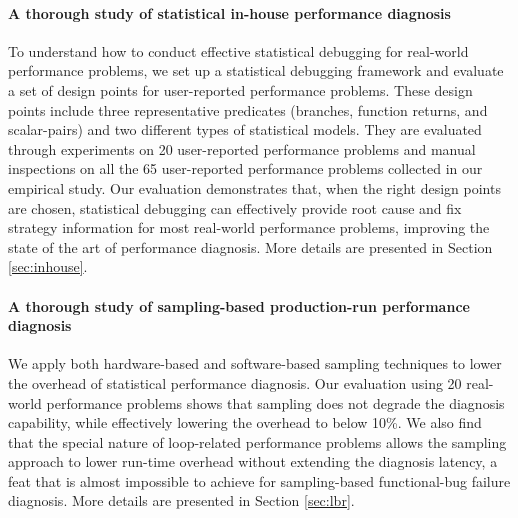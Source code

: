 \paragraph{A thorough study of statistical in-house performance diagnosis}
To understand how to conduct effective statistical debugging for real-world
performance problems, we set up a statistical debugging framework and evaluate
a set of design points for user-reported performance problems. These
design points include
three representative predicates (branches, function returns, and scalar-pairs)
and two different types of statistical models. They are evaluated through 
experiments on 
20 user-reported performance problems and manual inspections on
all the 65 user-reported performance problems collected in our empirical study. 
Our evaluation
demonstrates that, when the right design points are chosen, statistical
debugging can effectively provide root cause and fix strategy information
for most real-world performance problems,
improving the state of the art of performance diagnosis. 
More details are presented
in Section \ref{sec:inhouse}.

\paragraph{A thorough study of sampling-based production-run performance diagnosis}
We apply both hardware-based and software-based sampling techniques to
lower the overhead of statistical performance diagnosis.
Our evaluation using 20 real-world performance problems shows that
sampling does not degrade the diagnosis capability, while effectively
lowering the overhead to below 10\%. We also find that the special
nature of loop-related performance problems allows the sampling approach
to lower run-time overhead without extending the diagnosis latency,
a feat that is almost impossible to achieve for sampling-based
functional-bug failure diagnosis. More details are presented in Section \ref{sec:lbr}.

